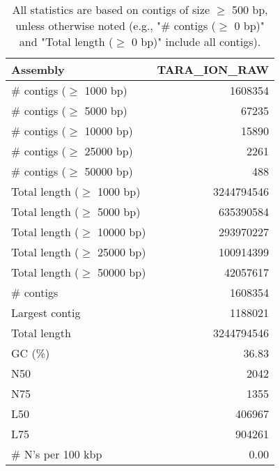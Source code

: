 \documentclass[12pt,a4paper]{article}
\begin{document}
\begin{table}[ht]
\begin{center}
\caption{All statistics are based on contigs of size $\geq$ 500 bp, unless otherwise noted (e.g., "\# contigs ($\geq$ 0 bp)" and "Total length ($\geq$ 0 bp)" include all contigs).}
\begin{tabular}{|l*{1}{|r}|}
\hline
Assembly & TARA\_ION\_RAW \\ \hline
\# contigs ($\geq$ 1000 bp) & 1608354 \\ \hline
\# contigs ($\geq$ 5000 bp) & 67235 \\ \hline
\# contigs ($\geq$ 10000 bp) & 15890 \\ \hline
\# contigs ($\geq$ 25000 bp) & 2261 \\ \hline
\# contigs ($\geq$ 50000 bp) & 488 \\ \hline
Total length ($\geq$ 1000 bp) & 3244794546 \\ \hline
Total length ($\geq$ 5000 bp) & 635390584 \\ \hline
Total length ($\geq$ 10000 bp) & 293970227 \\ \hline
Total length ($\geq$ 25000 bp) & 100914399 \\ \hline
Total length ($\geq$ 50000 bp) & 42057617 \\ \hline
\# contigs & 1608354 \\ \hline
Largest contig & 1188021 \\ \hline
Total length & 3244794546 \\ \hline
GC (\%) & 36.83 \\ \hline
N50 & 2042 \\ \hline
N75 & 1355 \\ \hline
L50 & 406967 \\ \hline
L75 & 904261 \\ \hline
\# N's per 100 kbp & 0.00 \\ \hline
\end{tabular}
\end{center}
\end{table}
\end{document}
